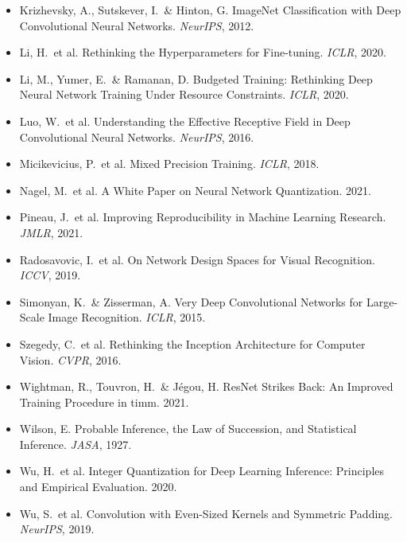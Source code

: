 \documentclass[10pt,a4paper]{article}
\begin{document}
\begin{itemize}[leftmargin=1.2em,itemsep=0.1em,topsep=0.2em,label={\color{accent}\textbullet}]
\item Krizhevsky, A., Sutskever, I.\ \& Hinton, G. ImageNet Classification with Deep Convolutional Neural Networks. \emph{NeurIPS}, 2012.
\item Li, H.\ et al. Rethinking the Hyperparameters for Fine-tuning. \emph{ICLR}, 2020.
\item Li, M., Yumer, E.\ \& Ramanan, D. Budgeted Training: Rethinking Deep Neural Network Training Under Resource Constraints. \emph{ICLR}, 2020.
\item Luo, W.\ et al. Understanding the Effective Receptive Field in Deep Convolutional Neural Networks. \emph{NeurIPS}, 2016.
\item Micikevicius, P.\ et al. Mixed Precision Training. \emph{ICLR}, 2018.
\item Nagel, M.\ et al. A White Paper on Neural Network Quantization. 2021.
\item Pineau, J.\ et al. Improving Reproducibility in Machine Learning Research. \emph{JMLR}, 2021.
\item Radosavovic, I.\ et al. On Network Design Spaces for Visual Recognition. \emph{ICCV}, 2019.
\item Simonyan, K.\ \& Zisserman, A. Very Deep Convolutional Networks for Large-Scale Image Recognition. \emph{ICLR}, 2015.
\item Szegedy, C.\ et al. Rethinking the Inception Architecture for Computer Vision. \emph{CVPR}, 2016.
\item Wightman, R., Touvron, H.\ \& Jégou, H. ResNet Strikes Back: An Improved Training Procedure in timm. 2021.
\item Wilson, E. Probable Inference, the Law of Succession, and Statistical Inference. \emph{JASA}, 1927.
\item Wu, H.\ et al. Integer Quantization for Deep Learning Inference: Principles and Empirical Evaluation. 2020.
\item Wu, S.\ et al. Convolution with Even-Sized Kernels and Symmetric Padding. \emph{NeurIPS}, 2019.
\end{itemize}
\endgroup
\end{document}
